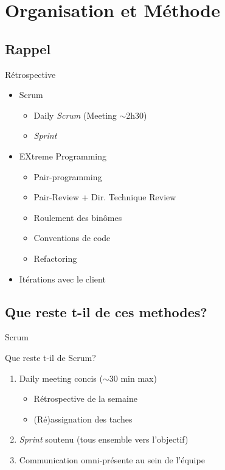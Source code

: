 \section{Organisation et Méthode}

\subsection{Rappel}

\begin{frame}{Rétrospective}
  \begin{block}{}
    \begin{itemize}
      \item Scrum
        \begin{itemize}
          \item Daily \emph{Scrum} (Meeting $\sim$2h30)
          \item \emph{Sprint}
        \end{itemize}
      \item EXtreme Programming
        \begin{itemize}
          \item Pair-programming
          \item Pair-Review + Dir. Technique Review
          \item Roulement des binômes
          \item Conventions de code
          \item Refactoring
        \end{itemize}
      \item Itérations avec le client
   \end{itemize}
  \end{block}
\end{frame}

\subsection{Que reste t-il de ces methodes?}

\begin{frame}{Scrum}
  \begin{block}{Que reste t-il de Scrum?}
    \begin{enumerate}
      \item Daily meeting concis ($\sim$30 min max)
        \begin{itemize}
          \item Rétrospective de la semaine
          \item (Ré)assignation des taches
        \end{itemize}
      \item \emph{Sprint} soutenu (tous ensemble vers l'objectif)
      \item Communication omni-présente au sein de l'équipe
    \end{enumerate}
  \end{block}
\end{frame}

